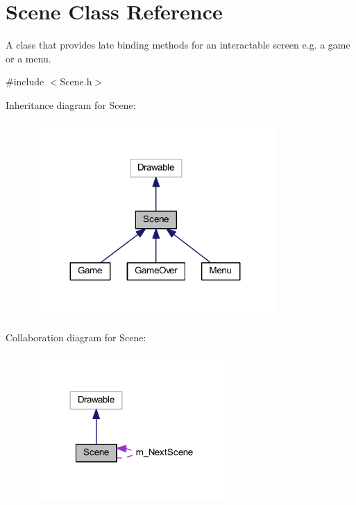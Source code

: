 \hypertarget{class_scene}{}\section{Scene Class Reference}
\label{class_scene}


A class that provides late binding methods for an interactable screen e.\+g. a game or a menu.  




{\ttfamily \#include $<$Scene.\+h$>$}



Inheritance diagram for Scene\+:\nopagebreak
\begin{figure}[H]
\begin{center}
\leavevmode
\includegraphics[width=263pt]{class_scene__inherit__graph}
\end{center}
\end{figure}


Collaboration diagram for Scene\+:\nopagebreak
\begin{figure}[H]
\begin{center}
\leavevmode
\includegraphics[width=213pt]{class_scene__coll__graph}
\end{center}
\end{figure}
